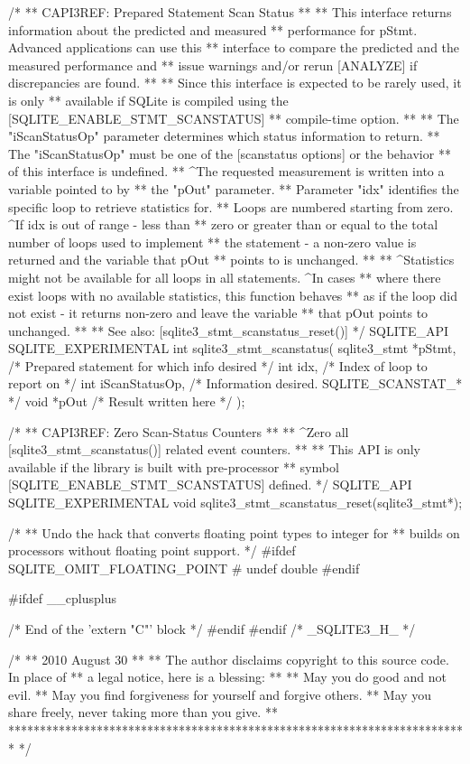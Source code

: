 \begin{Codex}[label=sqlite3.h,numbers=left]
{/*
** CAPI3REF: Prepared Statement Scan Status
**
** This interface returns information about the predicted and measured
** performance for pStmt.  Advanced applications can use this
** interface to compare the predicted and the measured performance and
** issue warnings and/or rerun [ANALYZE] if discrepancies are found.
**
** Since this interface is expected to be rarely used, it is only
** available if SQLite is compiled using the [SQLITE_ENABLE_STMT_SCANSTATUS]
** compile-time option.
**
** The "iScanStatusOp" parameter determines which status information to return.
** The "iScanStatusOp" must be one of the [scanstatus options] or the behavior
** of this interface is undefined.
** ^The requested measurement is written into a variable pointed to by
** the "pOut" parameter.
** Parameter "idx" identifies the specific loop to retrieve statistics for.
** Loops are numbered starting from zero. ^If idx is out of range - less than
** zero or greater than or equal to the total number of loops used to implement
** the statement - a non-zero value is returned and the variable that pOut
** points to is unchanged.
**
** ^Statistics might not be available for all loops in all statements. ^In cases
** where there exist loops with no available statistics, this function behaves
** as if the loop did not exist - it returns non-zero and leave the variable
** that pOut points to unchanged.
**
** See also: [sqlite3_stmt_scanstatus_reset()]
*/
SQLITE_API SQLITE_EXPERIMENTAL int sqlite3_stmt_scanstatus(
  sqlite3_stmt *pStmt,      /* Prepared statement for which info desired */
  int idx,                  /* Index of loop to report on */
  int iScanStatusOp,        /* Information desired.  SQLITE_SCANSTAT_* */
  void *pOut                /* Result written here */
);     

/*
** CAPI3REF: Zero Scan-Status Counters
**
** ^Zero all [sqlite3_stmt_scanstatus()] related event counters.
**
** This API is only available if the library is built with pre-processor
** symbol [SQLITE_ENABLE_STMT_SCANSTATUS] defined.
*/
SQLITE_API SQLITE_EXPERIMENTAL void sqlite3_stmt_scanstatus_reset(sqlite3_stmt*);


/*
** Undo the hack that converts floating point types to integer for
** builds on processors without floating point support.
*/
#ifdef SQLITE_OMIT_FLOATING_POINT
# undef double
#endif

#ifdef __cplusplus
}  /* End of the 'extern "C"' block */
#endif
#endif /* _SQLITE3_H_ */

/*
** 2010 August 30
**
** The author disclaims copyright to this source code.  In place of
** a legal notice, here is a blessing:
**
**    May you do good and not evil.
**    May you find forgiveness for yourself and forgive others.
**    May you share freely, never taking more than you give.
**
*************************************************************************
*/


\end{Codex}
